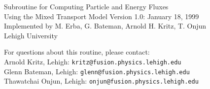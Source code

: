 \documentclass{article}    %
\begin{document}
\begin{center}
{\LARGE Subroutine for Computing Particle and Energy Fluxes\\ \vskip8pt
Using the Mixed Transport Model}\vskip1.0cm
Version 1.0: January 18, 1999 \\ 
Implemented by M. Erba, G. Bateman, Arnold H. Kritz, T. Onjun\\
 Lehigh University
\end{center}
For questions about this routine, please contact: \\
Arnold Kritz, Lehigh: {\tt kritz@fusion.physics.lehigh.edu}\\
Glenn Bateman, Lehigh: {\tt glenn@fusion.physics.lehigh.edu}\\
Thawatchai Onjun, Lehigh: {\tt onjun@fusion.physics.lehigh.edu}\\ \vskip8pt
\end{document}
